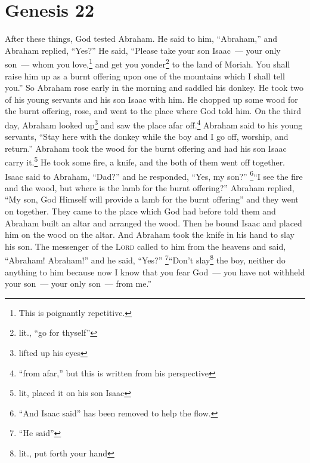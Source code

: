 \section{Genesis 22}\label{Genesis 22}
\begin{enumerate}[align=center]
     After these things, God tested Abraham. He said to him, ``Abraham,'' and Abraham replied, ``Yes?''%
     He said, ``Please take your son Isaac~--- your only son~--- whom you love,\footnote{This is poignantly repetitive.} and get you yonder\footnote{lit., ``go for thyself''} to the land of Moriah. You shall raise him up as a burnt offering upon one of the mountains which I shall tell you.''%
     So Abraham rose early in the morning and saddled his donkey. He took two of his young servants and his son Isaac with him. He chopped up some wood for the burnt offering, rose, and went to the place where God told him.%
     On the third day, Abraham looked up\footnote{lifted up his eyes} and saw the place afar off.\footnote{``from afar,'' but this is written from his perspective}%
     Abraham said to his young servants, ``Stay here with the donkey while the boy and I go off, worship, and return.''%
     Abraham took the wood for the burnt offering and had his son Isaac carry it.\footnote{lit, placed it on his son Isaac} He took some fire, a knife, and the both of them went off together.%
     Isaac said to Abraham, ``Dad?'' and he responded, ``Yes, my son?'' \footnote{``And Isaac said'' has been removed to help the flow.}``I see the fire and the wood, but where is the lamb for the burnt offering?''%
     Abraham replied, ``My son, God Himself will provide a lamb for the burnt offering'' and they went on together.%
     They came to the place which God had before told them and Abraham built an altar and arranged the wood. Then he bound Isaac and placed him on the wood on the altar.%
     And Abraham took the knife in his hand to slay his son.%
     The messenger of the \textsc{Lord} called to him from the heavens and said, ``Abraham! Abraham!'' and he said, ``Yes?''%
     \footnote{``He said''}``Don't slay\footnote{lit., put forth your hand} the boy, neither do anything to him because now I know that you fear God~--- you have not withheld your son~--- your only son~--- from me.''%

\end{enumerate}
